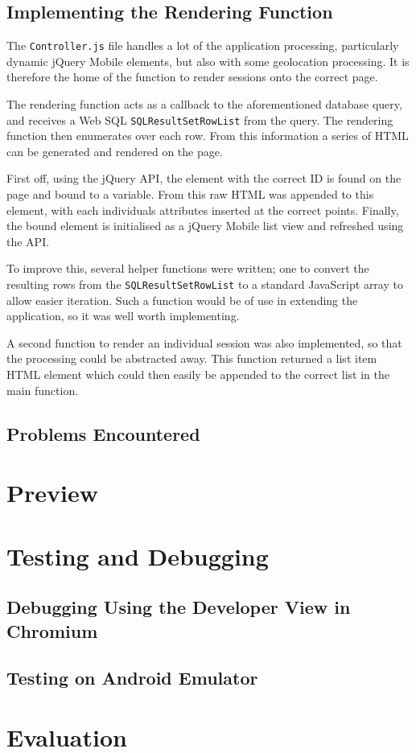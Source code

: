 \documentclass[10pt, a4paper]{article}
\begin{document}
\subsection{Implementing the Rendering Function}
The \texttt{Controller.js} file handles a lot of the application processing,
particularly dynamic jQuery Mobile elements, but also with some geolocation
processing. It is therefore the home of the function to render sessions onto
the correct page.

The rendering function acts as a callback to the aforementioned database query,
and receives a Web SQL \texttt{SQLResultSetRowList} from the query. The 
rendering function then enumerates over each row. From this information a 
series of HTML can be generated and rendered on the page.

First off, using the jQuery API, the element with the correct ID is found on 
the page and bound to a variable. From this raw HTML was appended to this
element, with each individuals attributes inserted at the correct points.
Finally, the bound element is initialised as a jQuery Mobile list view and
refreshed using the API.

To improve this, several helper functions were written; one to convert the
resulting rows from the \texttt{SQLResultSetRowList} to a standard JavaScript
array to allow easier iteration. Such a function would be of use in extending
the application, so it was well worth implementing.

A second function to render an individual session was also implemented, so that
the processing could be abstracted away. This function returned a list item 
HTML element which could then easily be appended to the correct list in the
main function.

\subsection{Problems Encountered}

\section{Preview}

\section{Testing and Debugging}

\subsection{Debugging Using the Developer View in Chromium}


\subsection{Testing on Android Emulator}


\section{Evaluation}


\newpage


\end{document}
